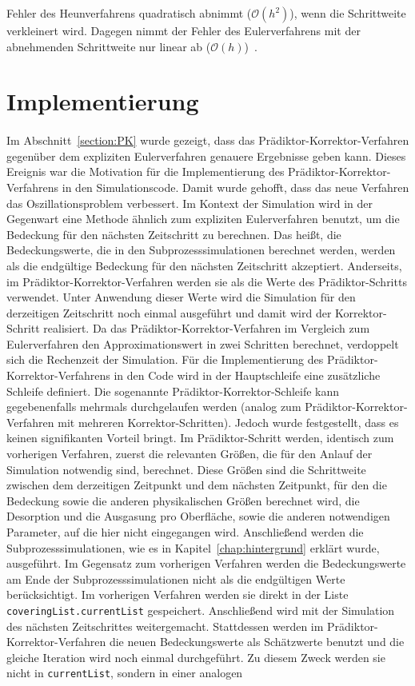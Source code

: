 \documentclass{listhesis}
\begin{document}
Fehler des Heunverfahrens quadratisch abnimmt ($\mathcal{O}(h^2)$), wenn die Schrittweite verkleinert wird. Dagegen nimmt der Fehler des Eulerverfahrens mit der abnehmenden Schrittweite nur linear ab ($\mathcal{O}(h)$)~\cite{ulbrich}.

\section{Implementierung} 
\label{section:implement}
\paragraph{}
Im Abschnitt~\ref{section:PK} wurde gezeigt, dass das Prädiktor-Korrektor-Verfahren gegen\-über dem expliziten Eulerverfahren genauere Ergebnisse geben kann. Dieses Ereignis war die Motivation für die Implementierung des Prädiktor-Korrektor-Verfahrens in den Simulationscode. Damit wurde gehofft, dass das neue Verfahren das Oszillationsproblem verbessert. Im Kontext der Simulation wird in der Gegenwart eine Methode ähnlich zum expliziten Eulerverfahren benutzt, um die Bedeckung für den nächsten Zeitschritt zu berechnen. Das heißt, die Bedeckungswerte, die in den Subprozesssimulationen berechnet werden, werden als die endgültige Bedeckung für den nächsten Zeitschritt akzeptiert. Anderseits, im Prädiktor-Korrektor-Verfahren werden sie als die Werte des Prädiktor-Schritts verwendet. Unter Anwendung dieser Werte wird die Simulation für den derzeitigen Zeitschritt noch einmal ausgeführt und damit wird der Korrektor-Schritt realisiert. Da das Prädiktor-Korrektor-Verfahren im Vergleich zum Eulerverfahren den Approximationswert in zwei Schritten berechnet, verdoppelt sich die Rechenzeit der Simulation. Für die Implementierung des Prädiktor-Korrektor-Verfahrens in den Code wird in der Hauptschleife eine zusätzliche Schleife definiert. Die sogenannte Prädiktor-Korrektor-Schleife kann gegebenenfalls mehrmals durchgelaufen werden (analog zum Prädiktor-Korrektor-Verfahren mit mehreren Korrektor-Schritten). Jedoch wurde festgestellt, dass es keinen signifikanten Vorteil bringt. Im Prädiktor-Schritt werden, identisch zum vorherigen Verfahren, zuerst die relevanten Größen, die für den Anlauf der Simulation notwendig sind, berechnet. Diese Größen sind die Schrittweite zwischen dem derzeitigen Zeitpunkt und dem nächsten Zeitpunkt, für den die Bedeckung sowie die anderen physikalischen Größen berechnet wird, die Desorption und die Ausgasung pro Oberfläche, sowie die anderen notwendigen Parameter, auf die hier nicht eingegangen wird. Anschließend werden die Subprozesssimulationen, wie es in Kapitel~\ref{chap:hintergrund} erklärt wurde, ausgeführt. Im Gegensatz zum vorherigen Verfahren werden die Bedeckungswerte am Ende der Subprozesssimulationen nicht als die endgültigen Werte berücksichtigt. Im vorherigen Verfahren werden sie direkt in der Liste \texttt{coveringList.currentList} gespeichert. Anschließend wird mit der Simulation des nächsten Zeitschrittes weitergemacht. Stattdessen werden im Prädiktor-Korrektor-Verfahren die neuen Bedeckungswerte als Schätzwerte benutzt und die gleiche Iteration wird noch einmal durchgeführt. Zu diesem Zweck werden sie nicht in \texttt{currentList}, sondern in einer analogen 
\end{document}
